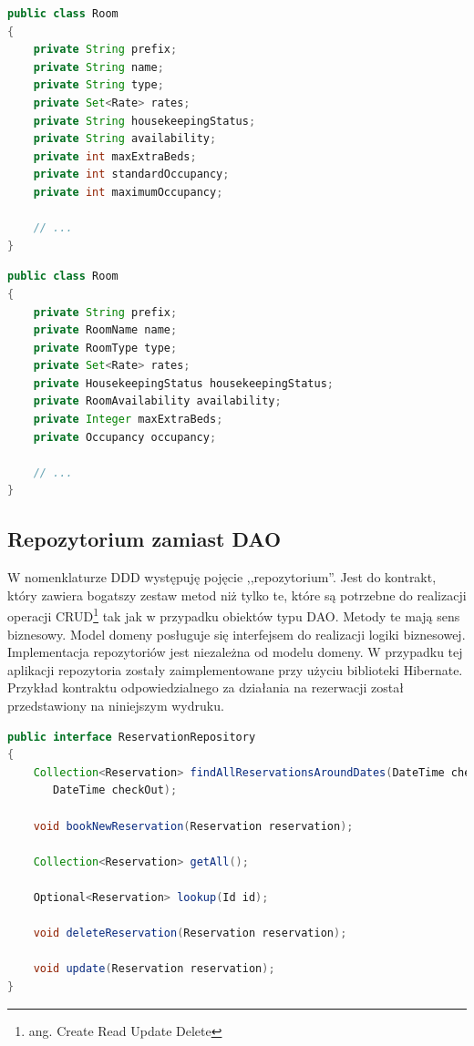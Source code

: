 \documentclass[a4paper,onecolumn,oneside,11pt,wide,floatssmall]{mwrep}
\theoremstyle{definition}
\theoremstyle{plain}%
\theoremstyle{remark}
\begin{document}
\begin{lstlisting}[language=Java,style=outcode,caption=anemiczne POJO]
public class Room
{
    private String prefix; 
    private String name;
    private String type;
    private Set<Rate> rates;
    private String housekeepingStatus;
    private String availability;
    private int maxExtraBeds;
    private int standardOccupancy;
    private int maximumOccupancy;

    // ...
}
\end{lstlisting}

\begin{lstlisting}[language=Java,style=outcode,caption=Agregat]
public class Room
{
    private String prefix; 
    private RoomName name;
    private RoomType type;
    private Set<Rate> rates;
    private HousekeepingStatus housekeepingStatus;
    private RoomAvailability availability;
    private Integer maxExtraBeds;
    private Occupancy occupancy;

    // ...
}
\end{lstlisting}

\subsection{Repozytorium zamiast DAO}
W nomenklaturze DDD występuję pojęcie ,,repozytorium''. Jest do kontrakt, który zawiera bogatszy zestaw metod niż tylko te, które są potrzebne do realizacji operacji CRUD\footnote{ang. Create Read Update Delete} tak jak w przypadku obiektów typu DAO. Metody te mają sens biznesowy. Model domeny posługuje się interfejsem do realizacji logiki biznesowej. Implementacja repozytoriów jest niezależna od modelu domeny. W przypadku tej aplikacji repozytoria zostały zaimplementowane przy użyciu biblioteki Hibernate. Przykład kontraktu odpowiedzialnego za działania na rezerwacji został przedstawiony na niniejszym wydruku.

\begin{lstlisting}[language=Java,style=outcode,caption=Repozytorium rezerwacji]
public interface ReservationRepository
{
    Collection<Reservation> findAllReservationsAroundDates(DateTime checkIn,
       DateTime checkOut);

    void bookNewReservation(Reservation reservation);

    Collection<Reservation> getAll();

    Optional<Reservation> lookup(Id id);

    void deleteReservation(Reservation reservation);

    void update(Reservation reservation);
}
\end{lstlisting}
\end{document}
